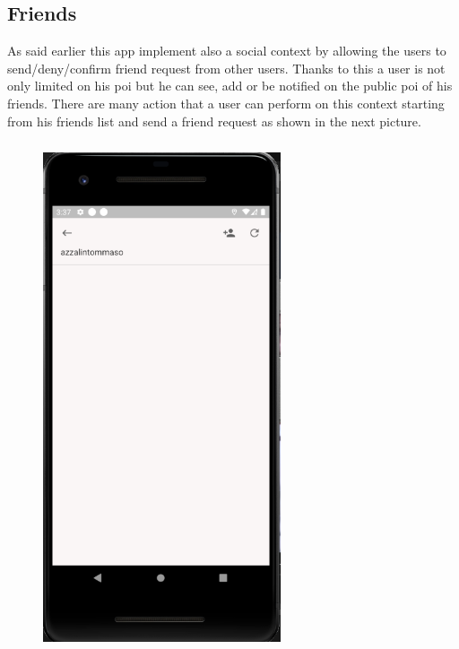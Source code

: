\documentclass[../../main]{subfiles}
\begin{document}
\subsection{Friends}
\label{ss:final-friends}
As said earlier this app implement also a social context by allowing the users to send/deny/confirm friend request from other users. Thanks to this
a user is not only limited on his poi but he can see, add or be notified on the public poi of his friends.
There are many action that a user can perform on this context starting from his friends list and send a friend request as shown in the next picture.
\begin{figure}[H]
    \centering
    \includegraphics[width=70mm,height=150mm]{images/app/friend/friend_overwiew.png}

\end{figure}
\end{document}
